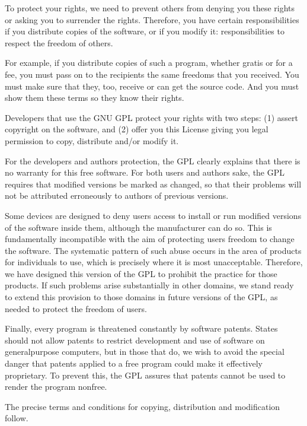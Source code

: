 \documentclass[letterpaper,10pt,english]{sphinxmanual}
\begin{document}
\begin{sphinxVerbatim}[commandchars=\\\{\}]
   To protect your rights, we need to prevent others from denying you these
   rights or asking you to surrender the rights. Therefore, you have certain
   responsibilities if you distribute copies of the software, or if you modify
   it: responsibilities to respect the freedom of others.

   For example, if you distribute copies of such a program, whether gratis or
   for a fee, you must pass on to the recipients the same freedoms that you
   received. You must make sure that they, too, receive or can get the source
   code. And you must show them these terms so they know their rights.

   Developers that use the GNU GPL protect your rights with two steps: (1)
   assert copyright on the software, and (2) offer you this License giving you
   legal permission to copy, distribute and/or modify it.

   For the developers\PYGZsq{} and authors\PYGZsq{} protection, the GPL clearly explains that
   there is no warranty for this free software. For both users\PYGZsq{} and authors\PYGZsq{}
   sake, the GPL requires that modified versions be marked as changed, so that
   their problems will not be attributed erroneously to authors of previous
   versions.

   Some devices are designed to deny users access to install or run modified
   versions of the software inside them, although the manufacturer can do
   so. This is fundamentally incompatible with the aim of protecting users\PYGZsq{}
   freedom to change the software. The systematic pattern of such abuse occurs
   in the area of products for individuals to use, which is precisely where it
   is most unacceptable. Therefore, we have designed this version of the GPL to
   prohibit the practice for those products. If such problems arise
   substantially in other domains, we stand ready to extend this provision to
   those domains in future versions of the GPL, as needed to protect the
   freedom of users.

   Finally, every program is threatened constantly by software patents. States
   should not allow patents to restrict development and use of software on
   general\PYGZhy{}purpose computers, but in those that do, we wish to avoid the
   special danger that patents applied to a free program could make it
   effectively proprietary. To prevent this, the GPL assures that patents
   cannot be used to render the program non\PYGZhy{}free.

   The precise terms and conditions for copying, distribution and modification
   follow.


\end{sphinxVerbatim}
\end{document}
